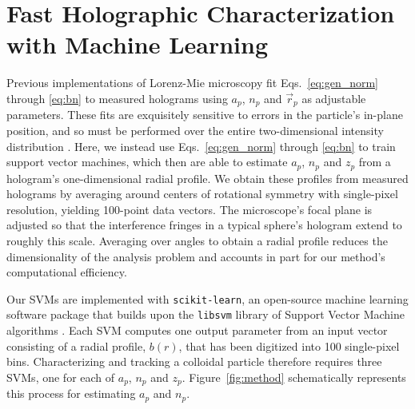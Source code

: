 \section{Fast Holographic Characterization with Machine Learning}

Previous implementations of Lorenz-Mie microscopy \cite{lee07a} 
fit Eqs.~\eqref{eq:gen_norm} through \eqref{eq:bn} to measured holograms using $a_p$, $n_p$
and $\vec{r}_p$ as adjustable parameters.
These fits are exquisitely sensitive to errors in the particle's
in-plane position, and so must be performed over the entire
two-dimensional intensity distribution \cite{lee07a}.
Here, we instead use Eqs.~\eqref{eq:gen_norm} through \eqref{eq:bn} to train
support vector machines, which then are able to estimate 
$a_p$, $n_p$ and $z_p$ from a hologram's one-dimensional
radial profile.
We obtain these profiles from measured holograms by averaging
around centers of rotational symmetry \cite{krishnatreya14a}
with single-pixel resolution, yielding 100-point data vectors.
The microscope's focal plane is adjusted so that the interference
fringes in a typical sphere's hologram extend to roughly this scale.
Averaging over angles to obtain a radial profile reduces the
dimensionality of the analysis problem and accounts in
part for our method's computational efficiency.

Our SVMs are 
implemented with {\tt scikit-learn}, an open-source
machine learning software package \cite{pedregosa11} that
builds upon the {\tt libsvm} library of Support Vector Machine algorithms
\cite{chang01,chang02}.
Each SVM computes one output parameter from an input vector
consisting of a radial profile, $b(r)$, that has been digitized
into 100 single-pixel bins.
Characterizing and tracking a colloidal particle therefore requires
three SVMs, one for each of $a_p$, $n_p$ and $z_p$.
Figure~\ref{fig:method} schematically represents this process
for estimating $a_p$ and $n_p$.

